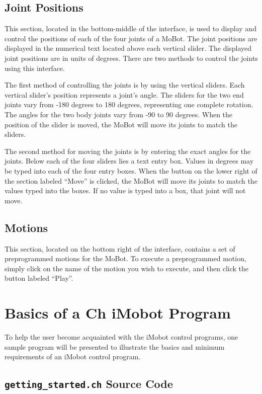 \documentclass{article}
\begin{document}
\subsection{Joint Positions}
This section, located in the bottom-middle of the interface, is used to display
and control the positions of each of the four
joints of a MoBot. The joint positions are displayed in the numerical
text located above each vertical slider. The displayed joint positions are in
units of degrees.  There are two methods to control
the joints using this interface.

The first method of controlling the joints is by using the vertical sliders.
Each vertical slider's position represents a joint's angle. The sliders for the
two end joints vary from -180 degrees to 180 degrees, representing one complete
rotation. The angles for the two body joints vary from -90 to 90 degrees. When
the position of the slider is moved, the MoBot will move its joints to match the 
sliders. 

The second method for moving the joints is by entering the exact angles for the
joints. Below each of the four sliders lies a text entry box. Values in degrees
may be typed into each of the four entry boxes. When the button on the lower
right of the section labeled ``Move'' is clicked, the MoBot will move its joints
to match the values typed into the boxes. If no value is typed into a box, that 
joint will not move.

\subsection{Motions}
This section, located on the bottom right of the interface, contains a set of
preprogrammed motions for the MoBot. To execute a preprogrammed motion, simply
click on the name of the motion you wish to execute, and then click the button
labeled ``Play''.

\section{Basics of a Ch iMobot Program}
To help the user become acquainted with the iMobot control programs, one sample
program will be presented to illustrate the basics and minimum requirements of
an iMobot control program. 

\subsection{\texttt{getting\_started.ch} Source Code}

\end{document}
